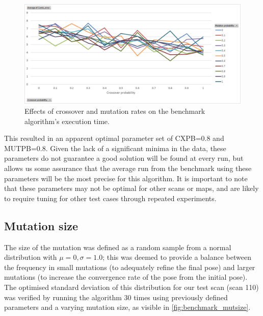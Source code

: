\documentclass[authoryearcitations]{UoYCSproject}
\begin{document}
\begin{figure}[H]
\centering
	\includegraphics[width=\textwidth,keepaspectratio]{images/ga_cxpb_mutpb.png}
	\caption[Optimising crossover and mutation rate for benchmark algorithm.]{Effects of crossover and mutation rates on the benchmark algorithm's execution time.}
	\label{fig:ga_cxpb_mutpb}
\end{figure}

 This resulted in an apparent optimal parameter set of CXPB=0.8 and MUTPB=0.8. Given the lack of a significant minima in the data, these parameters do not guarantee a good solution will be found at every run, but allows us some assurance that the average run from the benchmark using these parameters will be the most precise for this algorithm. It is important to note that these parameters may not be optimal for other scans or maps, and are likely to require tuning for other test cases through repeated experiments. 

\subsection{Mutation size}

The size of the mutation was defined as a random sample from a normal distribution with $\mu=0, \sigma=1.0$; this was deemed to provide a balance between the frequency in small mutations (to adequately refine the final pose) and larger mutations (to increase the convergence rate of the pose from the initial pose). The optimised standard deviation of this distribution for our test scan (scan 110) was verified by running the algorithm 30 times using previously defined parameters and a varying mutation size, as visible in \autoref{fig:benchmark_mutsize}.

\datatablebenchmarkmutsize
\end{document}
